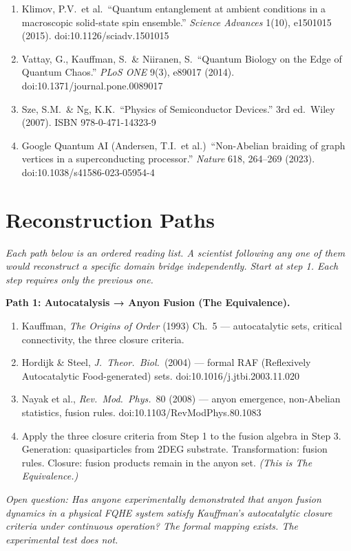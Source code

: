 \begin{enumerate}
\item Klimov, P.V.\ et al.\ ``Quantum entanglement at ambient conditions in a macroscopic solid-state spin ensemble.'' \textit{Science Advances} 1(10), e1501015 (2015). doi:10.1126/sciadv.1501015
\item Vattay, G., Kauffman, S.\ \& Niiranen, S.\ ``Quantum Biology on the Edge of Quantum Chaos.'' \textit{PLoS ONE} 9(3), e89017 (2014). doi:10.1371/journal.pone.0089017
\item Sze, S.M.\ \& Ng, K.K.\ ``Physics of Semiconductor Devices.'' 3rd ed.\ Wiley (2007). ISBN 978-0-471-14323-9
\item Google Quantum AI (Andersen, T.I.\ et al.)\ ``Non-Abelian braiding of graph vertices in a superconducting processor.'' \textit{Nature} 618, 264--269 (2023). doi:10.1038/s41586-023-05954-4
\end{enumerate}

\section*{Reconstruction Paths}

\noindent\textit{Each path below is an ordered reading list. A scientist following any one of them would reconstruct a specific domain bridge independently. Start at step 1. Each step requires only the previous one.}

\medskip

\noindent\textbf{Path 1: Autocatalysis → Anyon Fusion (The Equivalence).}

\begin{enumerate}
\item Kauffman, \textit{The Origins of Order} (1993) Ch.~5 --- autocatalytic sets, critical connectivity, the three closure criteria.
\item Hordijk \& Steel, \textit{J.\ Theor.\ Biol.}\ (2004) --- formal RAF (Reflexively Autocatalytic Food-generated) sets. doi:10.1016/j.jtbi.2003.11.020
\item Nayak et al., \textit{Rev.\ Mod.\ Phys.}\ 80 (2008) --- anyon emergence, non-Abelian statistics, fusion rules. doi:10.1103/RevModPhys.80.1083
\item Apply the three closure criteria from Step 1 to the fusion algebra in Step 3. Generation: quasiparticles from 2DEG substrate. Transformation: fusion rules. Closure: fusion products remain in the anyon set. \textit{(This is The Equivalence.)}
\end{enumerate}

\noindent\textit{Open question: Has anyone experimentally demonstrated that anyon fusion dynamics in a physical FQHE system satisfy Kauffman's autocatalytic closure criteria under continuous operation? The formal mapping exists. The experimental test does not.}

